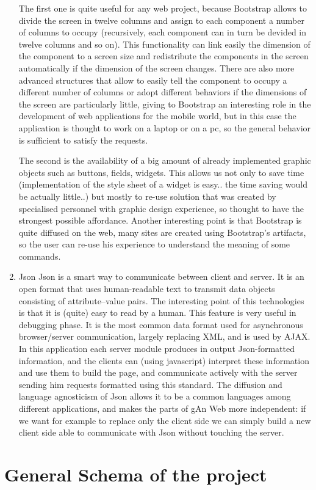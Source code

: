 \begin{enumerate}
The first one is quite useful for any web project, because Bootstrap allows to divide the screen in twelve columns and assign to each component a number of columns to occupy (recursively, each component can in turn be devided in twelve columns and so on). This functionality can link easily the dimension of the component to a screen size and redistribute the components in the screen automatically if the dimension of the screen changes. There are also more advanced structures that allow to easily tell the component to occupy a different number of columns or adopt different behaviors if the dimensions of the screen are particularly little, giving to Bootstrap an interesting role in the development of web applications for the mobile world, but in this case the application is thought to work on a laptop or on a pc, so the general behavior is sufficient to satisfy the requests.



The second is the availability of a big amount of already implemented graphic objects such as buttons, fields, widgets. This allows us not only to save time (implementation of the style sheet of a widget is easy.. the time saving would be actually little..) but mostly to re-use solution that was created by specialised personnel with graphic design experience, so thought to have the strongest possible affordance. Another interesting point is that Bootstrap is quite diffused on the web, many sites are created using Bootstrap's artifacts, so the user can re-use his experience to understand the meaning of some commands. 
  
\item
Json
Json is a smart way to communicate between client and server.
It is an open format that uses human-readable text to transmit data objects consisting of attribute–value pairs. The interesting point of this technologies is that it is (quite) easy to read by a human. This feature is very useful in debugging phase.  
It is the most common data format used for asynchronous browser/server communication, largely replacing XML, and is used by AJAX. In this application each server module produces in output Json-formatted information, and the clients can (using javascript) interpret these information and use them to build the page, and communicate actively with the server sending him requests formatted using this standard.
The diffusion and language agnosticism of Json allows it to be a common languages among different applications, and makes the parts of gAn Web more independent: if we want for example to replace only the client side we can simply build a new client side able to communicate with Json without touching the server. 

\end{enumerate}  


\section{General Schema of the project}

